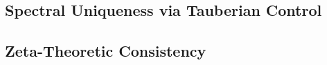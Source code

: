 \subsection{Spectral Uniqueness via Tauberian Control}




\subsection{Zeta-Theoretic Consistency}





